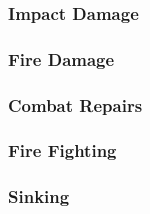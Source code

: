 \begin{multicols*}{2}
\subsubsection{Impact Damage}
\subsubsection{Fire Damage}
\subsubsection{Combat Repairs}
\subsubsection{Fire Fighting}
\subsubsection{Sinking}
\end{multicols*}
